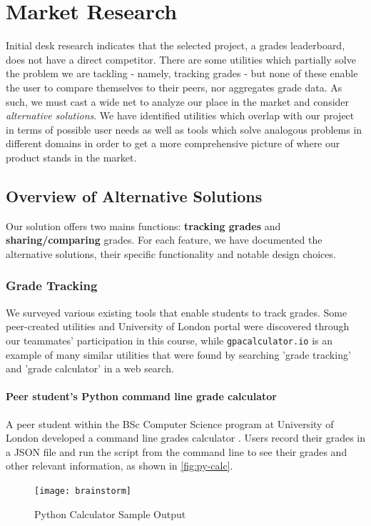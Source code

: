 \section{Market Research}
Initial desk research indicates that the selected project, a grades leaderboard, does not have a direct competitor. There are some utilities which partially solve the problem we are tackling - namely, tracking grades - but none of these enable the user to compare themselves to their peers, nor aggregates grade data. As such, we must cast a wide net to analyze our place in the market and consider \emph{alternative solutions}. We have identified utilities which overlap with our project in terms of possible user needs as well as tools which solve analogous problems in different domains in order to get a more comprehensive picture of where our product stands in the market.
\subsection{Overview of Alternative Solutions}
Our solution offers two mains functions: \textbf{tracking grades} and \textbf{sharing/comparing} grades. For each feature, we have documented the alternative solutions, their specific functionality and notable design choices.

\subsubsection{Grade Tracking}
We surveyed various existing tools that enable students to track grades. Some peer-created utilities and University of London portal were discovered through our teammates' participation in this course, while \texttt{gpacalculator.io} \cite{gpa_calculator} is an example of many similar utilities that were found by searching 'grade tracking' and 'grade calculator' in a web search.

\paragraph{Peer student's Python command line grade calculator}
A peer student within the BSc Computer Science program at University of London developed a command line grades calculator \cite{lavoie_2020}. Users record their grades in a JSON file and run the script from the command line to see their grades and other relevant information, as shown in \autoref{fig:py-calc}.

\begin{figure}[H]
\centering
\texttt{[image: brainstorm]}
\caption{Python Calculator Sample Output}
\label{fig:py-calc}
\end{figure}

